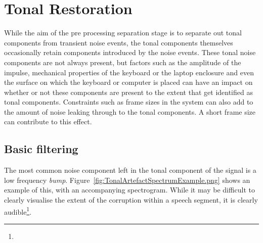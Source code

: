 %

\section{Tonal Restoration}
While the aim of the pre processing separation stage is to separate out tonal components from transient noise events, the tonal components themselves occasionally retain components introduced by the noise events. These tonal noise components are not always present, but factors such as the amplitude of the impulse, mechanical properties of the keyboard or the laptop enclosure and even the surface on which the keyboard or computer is placed can have an impact on whether or not these components are present to the extent that get identified as tonal components. Constraints such as frame sizes in the system can also add to the amount of noise leaking through to the tonal components. A short frame size can contribute to this effect.

\subsection{Basic filtering}
The most common noise component left in the tonal component of the signal is a low frequency \emph{bump}. Figure~\ref{fig:TonalArtefactSpectrumExample.png} shows an example of this, with an accompanying spectrogram. While it may be difficult to clearly visualise the extent of the corruption within a speech segment, it is clearly audible\footnote{}.

